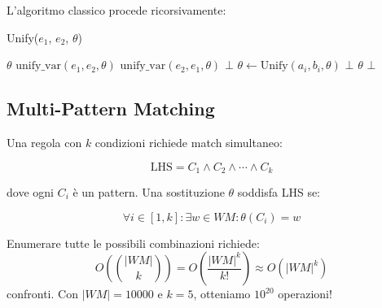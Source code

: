\begin{algoritmo}
L'algoritmo classico procede ricorsivamente:

\begin{algorithm}[H]
\caption{Unify($e_1$, $e_2$, $\theta$)}
\begin{algorithmic}[1]
    \State \Return $\theta$ 
    \State \Return $\text{unify\_var}(e_1, e_2, \theta)$
    \State \Return $\text{unify\_var}(e_2, e_1, \theta)$
        \State \Return $\bot$ 
    \Else
            \State $\theta \gets \text{Unify}(a_i, b_i, \theta)$
            \If{$\theta = \bot$}
                \State \Return $\bot$
            \EndIf
        \EndFor
        \State \Return $\theta$
    \EndIf
\Else
    \State \Return $\bot$ 
\EndIf
\end{algorithmic}
\end{algorithm}
\end{algoritmo}

\subsection{Multi-Pattern Matching}

Una regola con $k$ condizioni richiede match simultaneo:

\begin{equation}
\text{LHS} = C_1 \land C_2 \land \cdots \land C_k
\end{equation}

dove ogni $C_i$ è un pattern. Una sostituzione $\theta$ soddisfa LHS se:

\begin{equation}
\forall i \in [1, k]: \exists w \in WM: \theta(C_i) = w
\end{equation}

\begin{osservazione}
Enumerare tutte le possibili combinazioni richiede:
\begin{equation}
O\left(\binom{|WM|}{k}\right) = O\left(\frac{|WM|^k}{k!}\right) \approx O(|WM|^k)
\end{equation}
confronti. Con $|WM| = 10000$ e $k = 5$, otteniamo $10^{20}$ operazioni!
\end{osservazione}

